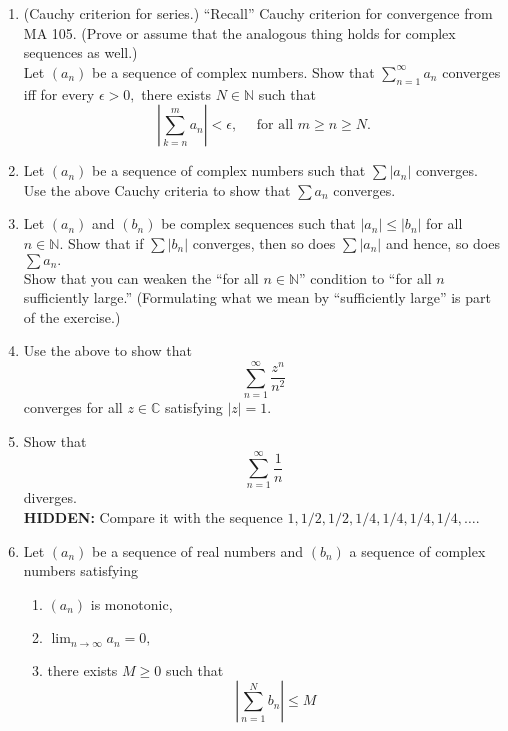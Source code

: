 \documentclass[12pt]{article}
\theoremstyle{definition}
\numberwithin{thm}{section}
\newcommand{\hint}[1]{\textbf{HIDDEN:} {\color[rgb]{0.95, 0.95, 0.95}#1}}
\begin{document}
\begin{enumerate}
	\item (Cauchy criterion for series.) ``Recall'' Cauchy criterion for convergence from MA 105. (Prove or assume that the analogous thing holds for complex sequences as well.)\\
	Let $(a_n)$ be a sequence of complex numbers. Show that $\displaystyle\sum_{n=1}^{\infty}a_n$ converges iff for every $\epsilon > 0,$ there exists $N \in \mathbb{N}$ such that
	\begin{equation*} 
		\left|\sum_{k=n}^{m}a_n\right| < \epsilon, \quad \text{ for all } m \ge n \ge N.
	\end{equation*}
	\item Let $(a_n)$ be a sequence of complex numbers such that $\sum|a_n|$ converges. Use the above Cauchy criteria to show that $\sum a_n$ converges.
	\item Let $(a_n)$ and $(b_n)$ be complex sequences such that $|a_n| \le |b_n|$ for all $n \in \mathbb{N}.$ Show that if $\sum |b_n|$ converges, then so does $\sum |a_n|$ and hence, so does $\sum a_n.$\\
	Show that you can weaken the ``for all $n \in \mathbb{N}$'' condition to ``for all $n$ sufficiently large.'' (Formulating what we mean by ``sufficiently large'' is part of the exercise.)
	\item Use the above to show that
	\begin{equation*} 
		\sum_{n=1}^{\infty}\dfrac{z^n}{n^2}
	\end{equation*}
	converges for all $z \in \mathbb{C}$ satisfying $|z| = 1.$
	\item Show that
	\begin{equation*} 
		\sum_{n=1}^{\infty}\dfrac{1}{n}
	\end{equation*}
	diverges. \\
	\hint{Compare it with the sequence $1, 1/2, 1/2, 1/4, 1/4, 1/4, 1/4,\ldots.$}
	\item Let $(a_n)$ be a sequence of real numbers and $(b_n)$ a sequence of complex numbers satisfying
	\begin{enumerate}
		\item $(a_n)$ is monotonic,
		\item $\displaystyle\lim_{n\to \infty}a_n = 0,$
		\item there exists $M \ge 0$ such that
		\begin{equation*} 
			\left|\sum_{n=1}^{N}b_n\right| \le M
		\end{equation*}

\end{enumerate}
\end{enumerate}
\end{document}
